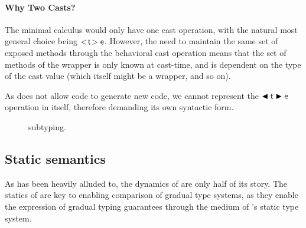 \documentclass[USenglish]{tex/lipics-v2016}
\begin{document}
\paragraph*{Why Two Casts?}

The minimal calculus would only have one cast operation, with the natural most
general choice being $\SubCast\t\e$. However, the need to maintain the same
set of exposed methods through the behavioral cast operation means that the
set of methods of the wrapper is only known at cast-time, and is dependent on
the type of the cast value (which itself might be a wrapper, and so on). 

As \kafka does not allow code to generate new code, we cannot represent the
$\BehCast\t\e$ operation in \kafka itself, therefore demanding its own
syntactic form.

\begin{figure}[!b] \hrulefill\small

\vspace{-2mm}

\begin{mathpar}

\hspace{-8mm}


\hspace{-8mm}

\end{mathpar}

\hrulefill\caption{\kafka subtyping.}\label{sub}%
\end{figure}


\subsection{Static semantics}

As has been heavily alluded to, the dynamics of \kafka are only half of its
story. The statics of \kafka are key to enabling comparison of gradual type
systems, as they enable the expression of gradual typing guarantees through
the medium of \kafka's static type system.
\end{document}
